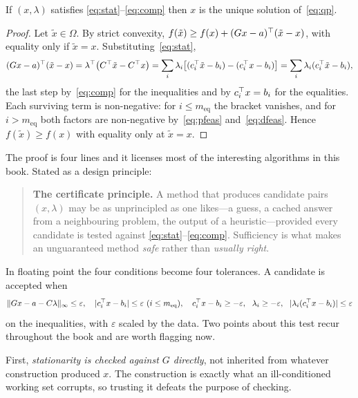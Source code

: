 \begin{proposition}[Sufficiency]
\label{prop:sufficient}
If $(x,\lambda)$ satisfies \eqref{eq:stat}--\eqref{eq:comp} then $x$ is the unique
solution of~\eqref{eq:qp}.
\end{proposition}

\begin{proof}
Let $\tilde x \in \Omega$. By strict convexity,
$f(\tilde x) \ge f(x) + (G x - a)^{\top}(\tilde x - x)$, with equality only if
$\tilde x = x$. Substituting~\eqref{eq:stat},
\[
  (G x - a)^{\top}(\tilde x - x)
  = \lambda^{\top}\bigl(C^{\top} \tilde x - C^{\top} x\bigr)
  = \sum_i \lambda_i\bigl[(c_i^{\top}\tilde x - b_i) - (c_i^{\top} x - b_i)\bigr]
  = \sum_i \lambda_i (c_i^{\top} \tilde x - b_i),
\]
the last step by~\eqref{eq:comp} for the inequalities and by $c_i^{\top} x = b_i$ for
the equalities. Each surviving term is non-negative: for
$i \le m_{\mathrm{eq}}$ the bracket vanishes, and for $i > m_{\mathrm{eq}}$ both
factors are non-negative by~\eqref{eq:pfeas} and~\eqref{eq:dfeas}. Hence
$f(\tilde x) \ge f(x)$ with equality only at $\tilde x = x$.
\end{proof}

The proof is four lines and it licenses most of the interesting algorithms in this
book. Stated as a design principle:

\begin{quote}
\textbf{The certificate principle.} A method that produces candidate pairs
$(x,\lambda)$ may be as unprincipled as one likes---a guess, a cached answer from
a neighbouring problem, the output of a heuristic---provided every candidate is
tested against \eqref{eq:stat}--\eqref{eq:comp}. Sufficiency is what makes an
unguaranteed method \emph{safe} rather than \emph{usually right}.
\end{quote}

In floating point the four conditions become four tolerances. A candidate is
accepted when
\begin{equation}
  \lVert G x - a - C\lambda \rVert_\infty \le \varepsilon,
  \quad |c_i^{\top} x - b_i| \le \varepsilon \ (i \le m_{\mathrm{eq}}),
  \quad c_i^{\top} x - b_i \ge -\varepsilon, \ \ \lambda_i \ge -\varepsilon,
  \ \ |\lambda_i (c_i^{\top} x - b_i)| \le \varepsilon
  \label{eq:certificate}
\end{equation}
on the inequalities, with $\varepsilon$ scaled by the data. Two points about this
test recur throughout the book and are worth flagging now.

First, \emph{stationarity is checked against $G$ directly}, not inherited from
whatever construction produced $x$. The construction is exactly what an
ill-conditioned working set corrupts, so trusting it defeats the purpose of
checking.

